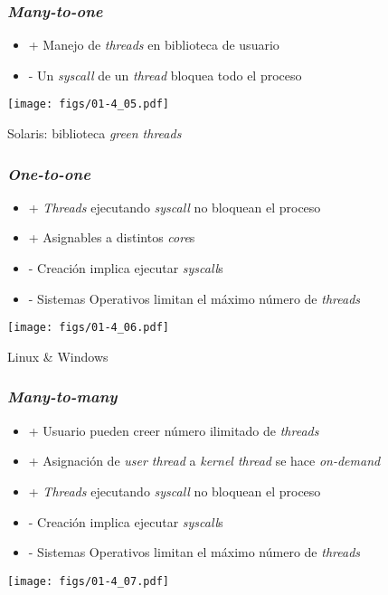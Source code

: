 \documentclass[letter]{beamer}
\begin{document}
\begin{frame}
  \frametitle{ {\em Many-to-one} }
  
  \begin{itemize}
    \item + Manejo de {\em threads} en biblioteca de usuario
    \item - Un {\em syscall} de un {\em thread} bloquea todo el proceso
  \end{itemize}

  \begin{center}
    \texttt{[image: figs/01-4\_05.pdf]}
  \end{center}  

  Solaris: biblioteca {\em green threads}

  
\end{frame}

\begin{frame}
  \frametitle{ {\em One-to-one} }
  
  \begin{itemize}
    \item + {\em Threads} ejecutando {\em syscall} no bloquean el proceso
    \item + Asignables a distintos {\em core}s
    \item - Creación implica ejecutar {\em syscall}s
    \item - Sistemas Operativos limitan el máximo número de {\em threads}
  \end{itemize}

  \begin{center}
    \texttt{[image: figs/01-4\_06.pdf]}
  \end{center}  

  Linux \& Windows
  
\end{frame}


\begin{frame}
  \frametitle{ {\em Many-to-many} }
  
  \begin{itemize}
    \item + Usuario pueden creer número ilimitado de {\em threads}
    \item + Asignación de {\em user thread} a {\em kernel thread} se hace {\em on-demand}
    \item + {\em Threads} ejecutando {\em syscall} no bloquean el proceso
    \item - Creación implica ejecutar {\em syscall}s
    \item - Sistemas Operativos limitan el máximo número de {\em threads}
  \end{itemize}

  \begin{center}
    \texttt{[image: figs/01-4\_07.pdf]}
  \end{center}  

  
\end{frame}
\end{document}
